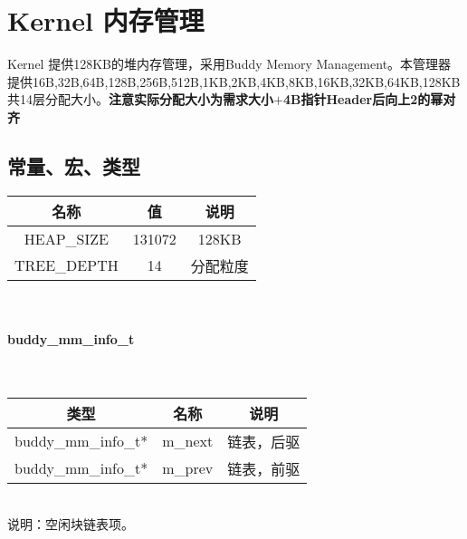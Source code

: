 %
% 
% 
% 
% 
% 
% 
%

\chapter{Kernel 内存管理}
Kernel 提供128KB的堆内存管理，采用Buddy Memory Management。本管理器提供16B,32B,64B,128B,256B,512B,1KB,2KB,4KB,8KB,16KB,32KB,64KB,128KB共14层分配大小。\textbf{注意实际分配大小为需求大小$+$4B指针Header后向上2的幂对齐}

\section{常量、宏、类型}
\noindent\begin{tabular}{|c|c|c|}
    \hline
    名称 & 值 & 说明\\\hline
    HEAP\_SIZE & 131072 & 128KB\\\hline
    TREE\_DEPTH & 14 & 分配粒度\\\hline
\end{tabular}\\

\subsubsection{buddy\_mm\_info\_t}
\\
\begin{tabular}{|c|c|c|}
    \hline
    类型 & 名称 & 说明\\\hline
    buddy\_mm\_info\_t* & m\_next & 链表，后驱\\\hline
    buddy\_mm\_info\_t* & m\_prev & 链表，前驱\\\hline
\end{tabular}\\
说明：空闲块链表项。

